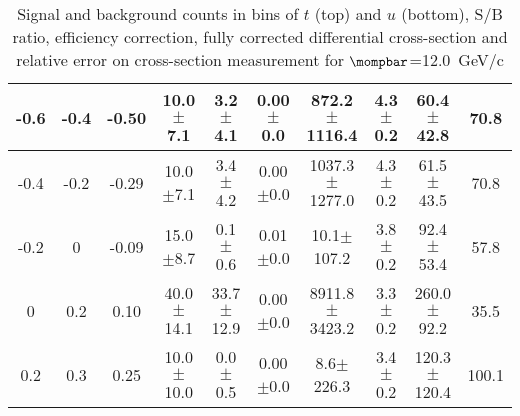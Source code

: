\begin{landscape}
\begin{table}[hbpt]
\begin{center}
\begin{tabular}{|c|c|c|c|c|c|c|c|c|c|}
 \hline 
 -0.6 & -0.4 & -0.50 & 10.0$\pm$7.1 &  3.2$\pm$4.1 &  0.00$\pm$0.0 &  872.2$\pm$1116.4 & 4.3$\pm$0.2 &  60.4$\pm$42.8 & 70.8 \\ 
 \hline 
 -0.4 & -0.2 & -0.29 & 10.0$\pm$7.1 &  3.4$\pm$4.2 &  0.00$\pm$0.0 &  1037.3$\pm$1277.0 & 4.3$\pm$0.2 &  61.5$\pm$43.5 & 70.8 \\ 
 \hline 
 -0.2 & 0 & -0.09 & 15.0$\pm$8.7 &  0.1$\pm$0.6 &  0.01$\pm$0.0 &  10.1$\pm$107.2 & 3.8$\pm$0.2 &  92.4$\pm$53.4 & 57.8 \\ 
 \hline 
 0 & 0.2 & 0.10 & 40.0$\pm$14.1 &  33.7$\pm$12.9 &  0.00$\pm$0.0 &  8911.8$\pm$3423.2 & 3.3$\pm$0.2 &  260.0$\pm$92.2 & 35.5 \\ 
 \hline 
 0.2 & 0.3 & 0.25 & 10.0$\pm$10.0 &  0.0$\pm$0.5 &  0.00$\pm$0.0 &  8.6$\pm$226.3 & 3.4$\pm$0.2 &  120.3$\pm$120.4 & 100.1 \\ 
 \hline 
    \end{tabular}
\caption{Signal and background counts in bins of $t$ (top) and $u$
         (bottom), S/B ratio, efficiency correction, fully corrected
         differential cross-section and relative error on cross-section
         measurement for $\mompbar$=12.0~GeV/c}
  \end{center}
\end{table}
\end{landscape}

